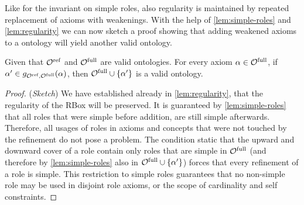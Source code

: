 Like for the invariant on simple roles, also regularity is maintained by repeated replacement of axioms with weakenings. With the help of \cref{lem:simple-roles} and \cref{lem:regularity} we can now sketch a proof showing that adding weakened axioms to a \SROIQ ontology will yield another valid \SROIQ ontology.

\begin{theorem} \label{lem:global-constraints}
Given that ${\mathcal{O}^\textnormal{ref}}$ and ${\mathcal{O}^\textnormal{full}}$ are valid \SROIQ ontologies. For every axiom $\alpha \in {\mathcal{O}^\textnormal{full}}$, if $\alpha' \in g_{{\mathcal{O}^\textnormal{ref}},{\mathcal{O}^\textnormal{full}}}(\alpha)$, then ${\mathcal{O}^\textnormal{full}} \cup \{ \alpha' \}$ is a valid \SROIQ ontology.
\end{theorem}

\begin{proof}(\emph{Sketch})
We have established already in \cref{lem:regularity}, that the regularity of the RBox will be preserved.
It is guaranteed by \cref{lem:simple-roles} that all roles that were simple before addition, are still simple afterwards. Therefore, all usages of roles in axioms and concepts that were not touched by the refinement do not pose a problem. The condition static that the upward and downward cover of a role contain only roles that are simple in ${\mathcal{O}^\textnormal{full}}$ (and therefore by \cref{lem:simple-roles} also in ${\mathcal{O}^\textnormal{full}} \cup \{ \alpha' \}$) forces that every refinement of a role is simple. This restriction to simple roles guarantees that no non-simple role may be used in disjoint role axioms, or the scope of cardinality and self constraints.
\end{proof}
